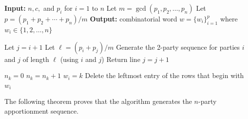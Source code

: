 \documentclass[pdflatex,sn-mathphys-num]{sn-jnl}
\theoremstyle{thmstyleone}%
\theoremstyle{thmstyletwo}%
\theoremstyle{thmstylethree}%
\begin{document}
\begin{algorithm} 
\caption{Lifting from all $\binom{n}{2}$ 2-party sequences to the $n$-party sequence}\label{algorithm-lift}
\begin{algorithmic}
    \State \textbf{Input:} $n, c,$ and $p_i$ for $i = 1$ to $n$
    \State Let $m = \gcd(p_1, p_2, \dots, p_n)$
    \State Let $p = (p_1 + p_2 + \cdots + p_n)/m$
    \State \textbf{Output:} combinatorial word $w = \{ w_i \}_{i=1}^p$ where $w_i \in \{1, 2, \dots, n\}$

        \State Let $j = i + 1$
            \State Let $\ell = (p_i + p_j)/m$
            \State Generate the 2-party sequence for parties $i$ and $j$ of length $\ell$ (using $i$ and $j$)
            \State Return line
            \State $j = j + 1$
        \EndWhile
    \EndFor

                \State $n_k = 0$
            \EndFor
                \State $n_k = n_k + 1$
            \EndIf
        \EndFor
                \State $w_i = k$
            \EndIf
        \EndFor
        \State Delete the leftmost entry of the rows that begin with $w_i$
    \EndFor
\end{algorithmic}
\end{algorithm}

The following theorem proves that the algorithm generates the $n$-party apportionment sequence. 
\end{document}
